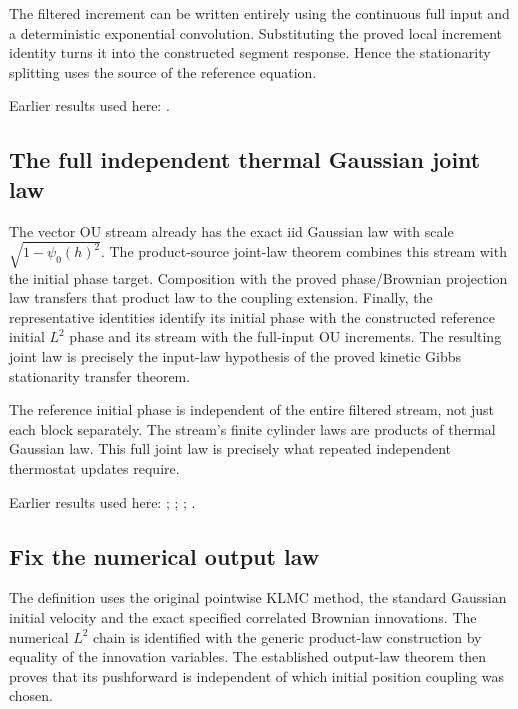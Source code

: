 \documentclass[11pt,a4paper]{report}
\begin{document}
The filtered increment can be written entirely using the continuous full input and a deterministic exponential convolution. Substituting the proved local increment identity turns it into the constructed segment response. Hence the stationarity splitting uses the source of the reference equation.



Earlier results used here: \cite[Section~3.17.1]{LangevinLean2026ULASC}.
\subsection{\texorpdfstring{The full independent thermal Gaussian joint law}{The full independent thermal Gaussian joint law}}
\label{report-step-KineticLangevin-GenericCanonicalKLMC-lean-13}


The vector OU stream already has the exact iid Gaussian law with scale \(\sqrt{1-\psi_0(h)^2}\). The product-source joint-law theorem combines this stream with the initial phase target. Composition with the proved phase/\allowbreak{}Brownian projection law transfers that product law to the coupling extension. Finally, the representative identities identify its initial phase with the constructed reference initial \(L^{2}\) phase and its stream with the full-input OU increments. The resulting joint law is precisely the input-law hypothesis of the proved kinetic Gibbs stationarity transfer theorem.



The reference initial phase is independent of the entire filtered stream, not just each block separately. The stream’s finite cylinder laws are products of thermal Gaussian law. This full joint law is precisely what repeated independent thermostat updates require.



Earlier results used here: \cite[Section~3.17.1]{LangevinLean2026ULASC}; \cite[Section~3.22.6]{LangevinLean2026ULASC}; \cite[Section~3.8.16]{LangevinLean2026ULASC}; \cite[Section~3.8.17]{LangevinLean2026ULASC}.
\subsection{\texorpdfstring{Fix the numerical output law}{Fix the numerical output law}}
\label{report-step-KineticLangevin-GenericCanonicalKLMC-lean-14}


The definition uses the original pointwise KLMC method, the standard Gaussian initial velocity and the exact specified correlated Brownian innovations. The numerical \(L^{2}\) chain is identified with the generic product-law construction by equality of the innovation variables. The established output-law theorem then proves that its pushforward is independent of which initial position coupling was chosen.
\end{document}
